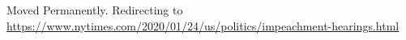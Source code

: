 Moved Permanently. Redirecting to
\url{https://www.nytimes.com/2020/01/24/us/politics/impeachment-hearings.html}
